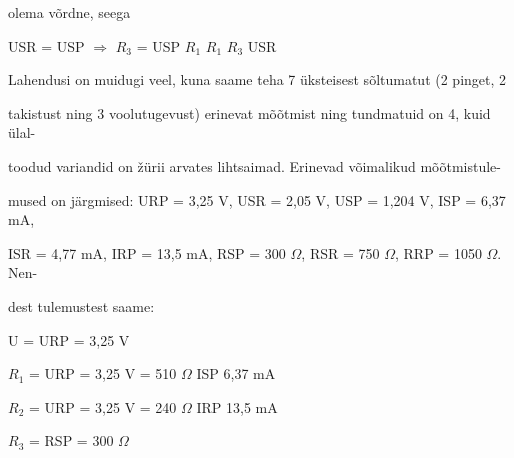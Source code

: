 olema võrdne, seega

USR = USP $\Rightarrow$ $R_3$ = USP $R_1$ $R_1$ $R_3$ USR

Lahendusi on muidugi veel, kuna saame teha 7 üksteisest sõltumatut (2 pinget, 2

takistust ning 3 voolutugevust) erinevat mõõtmist ning tundmatuid on 4, kuid ülal-

toodud variandid on žürii arvates lihtsaimad. Erinevad võimalikud mõõtmistule-

mused on järgmised: URP = 3,25 V, USR = 2,05 V, USP = 1,204 V, ISP = 6,37 mA,

ISR = 4,77 mA, IRP = 13,5 mA, RSP = 300 $\Omega$, RSR = 750 $\Omega$, RRP = 1050 $\Omega$. Nen-

dest tulemustest saame:

U = URP = 3,25 V

$R_1$ = URP = 3,25 V = 510 $\Omega$ ISP 6,37 mA

$R_2$ = URP = 3,25 V = 240 $\Omega$ IRP 13,5 mA

$R_3$ = RSP = 300 $\Omega$
\probend
